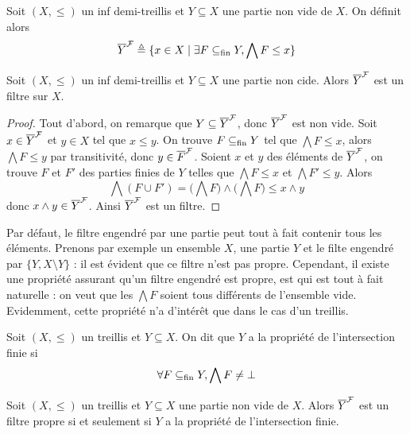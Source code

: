 \begin{definition}
  Soit $(X,\leq)$ un inf demi-treillis et $Y\subseteq X$ une partie non vide de
  $X$. On définit alors
  \[\overline{Y}^{\mathcal F} \triangleq \{x\in X \mid \exists F\subseteq_{\mathrm{fin}} Y, \bigwedge F \leq x\}\]
\end{definition}

\begin{proposition}
  Soit $(X,\leq)$ un inf demi-treillis et $Y\subseteq X$ une partie non cide.
  Alors $\overline{Y}^{\mathcal F}$ est un filtre sur $X$.
\end{proposition}

\begin{proof}
  Tout d'abord, on remarque que $Y\subseteq \overline{Y}^{\mathcal F}$, donc $\overline{Y}^{\mathcal F}$ est
  non vide. Soit $x\in \overline{Y}^{\mathcal F}$ et $y\in X$ tel que $x\leq y$. On trouve
  $F\subseteq_{\mathrm{fin}} Y$ tel que $\bigwedge F\leq x$, alors $\bigwedge F \leq y$ par
  transitivité, donc $y\in \overline{F}^{\mathcal F}$. Soient $x$ et $y$ des éléments de
  $\overline{Y}^{\mathcal F}$, on trouve $F$ et $F'$ des parties finies de $Y$ telles que
  $\bigwedge F \leq x$ et $\bigwedge F' \leq y$. Alors
  \[\bigwedge (F\cup F') = \Bigg(\bigwedge F\Bigg)\land\Bigg(\bigwedge F\Bigg)
  \leq x\land y\]
  donc $x\land y \in \overline{Y}^{\mathcal F}$. Ainsi $\overline{Y}^{\mathcal F}$ est un filtre.
\end{proof}

Par défaut, le filtre engendré par une partie peut tout à fait contenir tous
les éléments. Prenons par exemple un ensemble $X$, une partie $Y$ et le filte
engendré par $\{Y,X\setminus Y\}$ : il est évident que ce filtre n'est pas
propre. Cependant, il existe une propriété assurant qu'un filtre engendré est
propre, est qui est tout à fait naturelle : on veut que les $\bigwedge F$ soient
tous différents de l'ensemble vide. Evidemment, cette propriété n'a d'intérêt que
dans le cas d'un treillis.

\begin{definition}
  Soit $(X,\leq)$ un treillis et $Y\subseteq X$. On dit que $Y$ a la propriété
  de l'intersection finie si
  \[\forall F\subseteq_{\mathrm{fin}} Y, \bigwedge F\neq \bot\]
\end{definition}

\begin{proposition}
  Soit $(X,\leq)$ un treillis et $Y\subseteq X$ une partie non vide de $X$.
  Alors $\overline{Y}^{\mathcal F}$ est un filtre propre si et seulement si $Y$ a la propriété
  de l'intersection finie.
\end{proposition}

